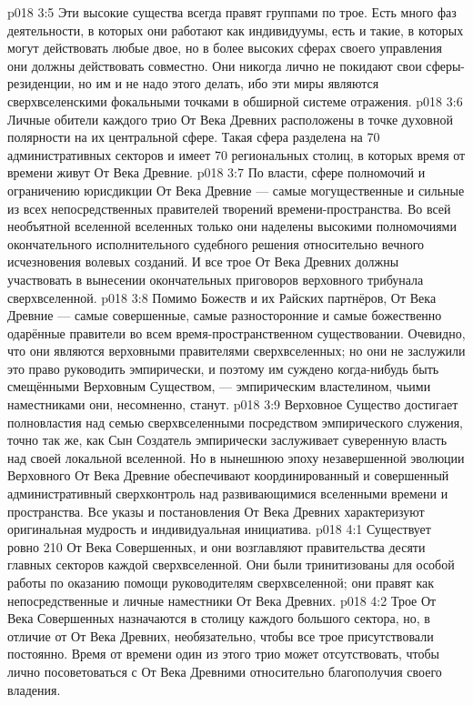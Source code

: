 \vs p018 3:5 \pc Эти высокие существа всегда правят группами по трое. Есть много фаз деятельности, в которых они работают как индивидуумы, есть и такие, в которых могут действовать любые двое, но в более высоких сферах своего управления они должны действовать совместно. Они никогда лично не покидают свои сферы\hyp{}резиденции, но им и не надо этого делать, ибо эти миры являются сверхвселенскими фокальными точками в обширной системе отражения.
\vs p018 3:6 Личные обители каждого трио От Века Древних расположены в точке духовной полярности на их центральной сфере. Такая сфера разделена на 70 административных секторов и имеет 70 региональных столиц, в которых время от времени живут От Века Древние.
\vs p018 3:7 По власти, сфере полномочий и ограничению юрисдикции От Века Древние --- самые могущественные и сильные из всех непосредственных правителей творений времени\hyp{}пространства. Во всей необъятной вселенной вселенных только они наделены высокими полномочиями окончательного исполнительного судебного решения относительно вечного исчезновения волевых созданий. И все трое От Века Древних должны участвовать в вынесении окончательных приговоров верховного трибунала сверхвселенной.
\vs p018 3:8 \pc Помимо Божеств и их Райских партнёров, От Века Древние --- самые совершенные, самые разносторонние и самые божественно одарённые правители во всем время\hyp{}пространственном существовании. Очевидно, что они являются верховными правителями сверхвселенных; но они не заслужили это право руководить эмпирически, и поэтому им суждено когда\hyp{}нибудь быть смещёнными Верховным Существом, --- эмпирическим властелином, чьими наместниками они, несомненно, станут.
\vs p018 3:9 Верховное Существо достигает полновластия над семью сверхвселенными посредством эмпирического служения, точно так же, как Сын Создатель эмпирически заслуживает суверенную власть над своей локальной вселенной. Но в нынешнюю эпоху незавершенной эволюции Верховного От Века Древние обеспечивают координированный и совершенный административный сверхконтроль над развивающимися вселенными времени и пространства. Все указы и постановления От Века Древних характеризуют оригинальная мудрость и индивидуальная инициатива.
\vs p018 4:1 Существует ровно 210 От Века Совершенных, и они возглавляют правительства десяти главных секторов каждой сверхвселенной. Они были тринитизованы для особой работы по оказанию помощи руководителям сверхвселенной; они правят как непосредственные и личные наместники От Века Древних.
\vs p018 4:2 Трое От Века Совершенных назначаются в столицу каждого большого сектора, но, в отличие от От Века Древних, необязательно, чтобы все трое присутствовали постоянно. Время от времени один из этого трио может отсутствовать, чтобы лично посоветоваться с От Века Древними относительно благополучия своего владения.
